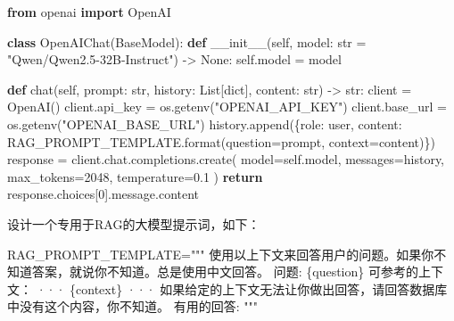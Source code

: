 \documentclass[
]{article}
\newenvironment{Shaded}{}{}
\newcommand{\BuiltInTok}[1]{\textcolor[rgb]{0.00,0.50,0.00}{#1}}
\newcommand{\ControlFlowTok}[1]{\textcolor[rgb]{0.00,0.44,0.13}{\textbf{#1}}}
\newcommand{\DecValTok}[1]{\textcolor[rgb]{0.25,0.63,0.44}{#1}}
\newcommand{\FloatTok}[1]{\textcolor[rgb]{0.25,0.63,0.44}{#1}}
\newcommand{\FunctionTok}[1]{\textcolor[rgb]{0.02,0.16,0.49}{#1}}
\newcommand{\ImportTok}[1]{\textcolor[rgb]{0.00,0.50,0.00}{\textbf{#1}}}
\newcommand{\KeywordTok}[1]{\textcolor[rgb]{0.00,0.44,0.13}{\textbf{#1}}}
\newcommand{\NormalTok}[1]{#1}
\newcommand{\OperatorTok}[1]{\textcolor[rgb]{0.40,0.40,0.40}{#1}}
\newcommand{\SpecialCharTok}[1]{\textcolor[rgb]{0.25,0.44,0.63}{#1}}
\newcommand{\StringTok}[1]{\textcolor[rgb]{0.25,0.44,0.63}{#1}}
\newcommand{\VariableTok}[1]{\textcolor[rgb]{0.10,0.09,0.49}{#1}}
\begin{document}
\begin{Shaded}
\begin{Highlighting}[]
\ImportTok{from}\NormalTok{ openai }\ImportTok{import}\NormalTok{ OpenAI}

\KeywordTok{class}\NormalTok{ OpenAIChat(BaseModel):}
    \KeywordTok{def} \FunctionTok{\_\_init\_\_}\NormalTok{(}\VariableTok{self}\NormalTok{, model: }\BuiltInTok{str} \OperatorTok{=} \StringTok{"Qwen/Qwen2.5{-}32B{-}Instruct"}\NormalTok{) }\OperatorTok{{-}\textgreater{}} \VariableTok{None}\NormalTok{:}
        \VariableTok{self}\NormalTok{.model }\OperatorTok{=}\NormalTok{ model}

    \KeywordTok{def}\NormalTok{ chat(}\VariableTok{self}\NormalTok{, prompt: }\BuiltInTok{str}\NormalTok{, history: List[}\BuiltInTok{dict}\NormalTok{], content: }\BuiltInTok{str}\NormalTok{) }\OperatorTok{{-}\textgreater{}} \BuiltInTok{str}\NormalTok{:}
\NormalTok{        client }\OperatorTok{=}\NormalTok{ OpenAI()}
\NormalTok{        client.api\_key }\OperatorTok{=}\NormalTok{ os.getenv(}\StringTok{"OPENAI\_API\_KEY"}\NormalTok{)   }
\NormalTok{        client.base\_url }\OperatorTok{=}\NormalTok{ os.getenv(}\StringTok{"OPENAI\_BASE\_URL"}\NormalTok{)}
\NormalTok{        history.append(\{}\StringTok{\textquotesingle{}role\textquotesingle{}}\NormalTok{: }\StringTok{\textquotesingle{}user\textquotesingle{}}\NormalTok{, }\StringTok{\textquotesingle{}content\textquotesingle{}}\NormalTok{: RAG\_PROMPT\_TEMPLATE.}\BuiltInTok{format}\NormalTok{(question}\OperatorTok{=}\NormalTok{prompt, context}\OperatorTok{=}\NormalTok{content)\})}
\NormalTok{        response }\OperatorTok{=}\NormalTok{ client.chat.completions.create(}
\NormalTok{                model}\OperatorTok{=}\VariableTok{self}\NormalTok{.model,}
\NormalTok{                messages}\OperatorTok{=}\NormalTok{history,}
\NormalTok{                max\_tokens}\OperatorTok{=}\DecValTok{2048}\NormalTok{,}
\NormalTok{                temperature}\OperatorTok{=}\FloatTok{0.1}
\NormalTok{            )}
        \ControlFlowTok{return}\NormalTok{ response.choices[}\DecValTok{0}\NormalTok{].message.content}
\end{Highlighting}
\end{Shaded}

设计一个专用于RAG的大模型提示词，如下：

\begin{Shaded}
\begin{Highlighting}[]
\NormalTok{RAG\_PROMPT\_TEMPLATE}\OperatorTok{=}\StringTok{"""}
\StringTok{使用以上下文来回答用户的问题。如果你不知道答案，就说你不知道。总是使用中文回答。}
\StringTok{问题: }\SpecialCharTok{\{question\}}
\StringTok{可参考的上下文：}
\StringTok{···}
\SpecialCharTok{\{context\}}
\StringTok{···}
\StringTok{如果给定的上下文无法让你做出回答，请回答数据库中没有这个内容，你不知道。}
\StringTok{有用的回答:}
\StringTok{"""}
\end{Highlighting}
\end{Shaded}
\end{document}
